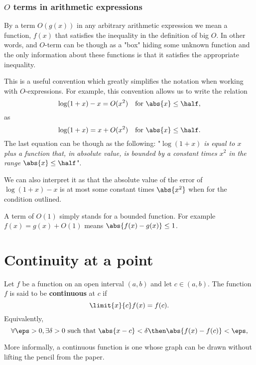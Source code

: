 \documentclass[12pt, a4paper]{article}
\begin{document}
\subsubsection{\texorpdfstring{\(O\)}{TEXT} terms in arithmetic expressions}

By a term \(O(g(x))\) in any arbitrary arithmetic expression we mean a function, \(f(x)\) that satisfies the inequality in the definition of big \(O\). In other words, and \(O\)-term can be though as a "box" hiding some unknown function and the only information about these functions is that it satisfies the appropriate inequality.

This is a useful convention which greatly simplifies the notation when working with \(O\)-expressions. For example, this convention allows us to write the relation
\[\log(1+x)-x=O(x^2) \quad \text{for } \abs{x} \leq \half,\] 
as
\[\log(1+x)=x+O(x^2) \quad \text{for } \abs{x} \leq \half.\]
The last equation can be though as the following: "\(\log(1+x)\) \textit{is equal to \(x\) plus a function that, in absolute value, is bounded by a constant times \(x^2\) in the range \(\abs{x} \leq \half\)}". 

We can also interpret it as that the absolute value of the error of \(\log(1+x)-x\) is at most some constant times \(\abs{x^2}\) when for the condition outlined.

\begin{mdremark}
    A term of \(O(1)\) simply stands for a bounded function. For example \(f(x)=g(x)+O(1)\) means \(\abs{f(x)-g(x)} \leq 1\).
\end{mdremark}

\section{Continuity at a point}

\begin{definition}
    Let \(f\) be a function on an open interval \((a,b)\) and let \(c\in (a,b)\). The function \(f\) is said to be \textbf{continuous} at \(c\) if 
    \[\limit{x}{c} f(x) = f(c).\]
    Equivalently, 
    \[\forall \eps>0, \exists \delta>0 \text{ such that } \abs{x-c}<\delta \then \abs{f(x)-f(c)}<\eps,\]
\end{definition}

\begin{mdnote}
    More informally, a continuous function is one whose graph can be drawn without lifting the pencil from the paper.
\end{mdnote}
\end{document}
